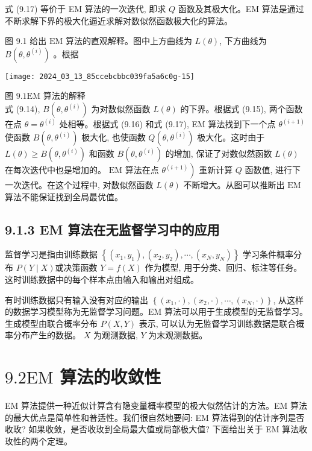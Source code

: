 \documentclass[10pt]{article}
\begin{document}
式 (9.17) 等价于 EM 算法的一次迭代, 即求 $Q$ 函数及其极大化。EM 算法是通过不断求解下界的极大化逼近求解对数似然函数极大化的算法。

图 9.1 给出 $\mathrm{EM}$ 算法的直观解释。图中上方曲线为 $L(\theta)$, 下方曲线为 $B\left(\theta, \theta^{(i)}\right)$ 。根据

\begin{center}
\texttt{[image: 2024\_03\_13\_85ccebcbbc039fa5a6c0g-15]}
\end{center}

图 $9.1 \mathrm{EM}$ 算法的解释\\
式 (9.14), $B\left(\theta, \theta^{(i)}\right)$ 为对数似然函数 $L(\theta)$ 的下界。根据式 (9.15), 两个函数在点 $\theta=\theta^{(i)}$ 处相等。根据式 (9.16) 和式 (9.17), EM 算法找到下一个点 $\theta^{(i+1)}$ 使函数 $B\left(\theta, \theta^{(i)}\right)$ 极大化, 也使函数 $Q\left(\theta, \theta^{(i)}\right)$ 极大化。这时由于 $L(\theta) \geqslant B\left(\theta, \theta^{(i)}\right)$ 和函数 $B\left(\theta, \theta^{(i)}\right)$ 的增加, 保证了对数似然函数 $L(\theta)$ 在每次迭代中也是增加的。 $\mathrm{EM}$ 算法在点 $\left.\theta^{(i+1)}\right)$ 重新计算 $Q$ 函数值, 进行下一次迭代。在这个过程中, 对数似然函数 $L(\theta)$ 不断增大。从图可以推断出 $\mathrm{EM}$ 算法不能保证找到全局最优值。

\subsection*{9.1.3 EM 算法在无监督学习中的应用}
监督学习是指由训练数据 $\left\{\left(x_{1}, y_{1}\right),\left(x_{2}, y_{2}\right), \cdots,\left(x_{N}, y_{N}\right)\right\}$ 学习条件概率分布 $P(Y \mid X)$或决策函数 $Y=f(X)$ 作为模型, 用于分类、回归、标注等任务。这时训练数据中的每个样本点由输入和输出对组成。

有时训练数据只有输入没有对应的输出 $\left\{\left(x_{1}, \cdot\right),\left(x_{2}, \cdot\right), \cdots,\left(x_{N}, \cdot\right)\right\}$, 从这样的数据学习模型称为无监督学习问题。EM 算法可以用于生成模型的无监督学习。生成模型由联合概率分布 $P(X, Y)$ 表示, 可以认为无监督学习训练数据是联合概率分布产生的数据。 $X$ 为观测数据, $Y$ 为末观测数据。

\section*{$9.2 \mathrm{EM}$ 算法的收敛性}
EM 算法提供一种近似计算含有隐变量概率模型的极大似然估计的方法。EM 算法的最大优点是简单性和普适性。我们很自然地要问: EM 算法得到的估计序列是否收玫? 如果收敛，是否收玫到全局最大值或局部极大值? 下面给出关于 EM 算法收玫性的两个定理。
\end{document}
